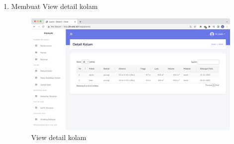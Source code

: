 \begin{enumerate}[1.]
Selanjutnya, filename dari file gambar tersebut akan diproses dengan fungsi secure\_filename dan pad\_timestamp untuk memastikan nama file yang aman dan unik. Path untuk menyimpan file gambar akan dibuat, dan file akan disimpan di path tersebut.

Kemudian, API akan mengambil data kolam ikan berdasarkan ID yang diberikan dari database. Gambar lama dari kolam ikan tersebut akan dihapus jika bukan "default.jpg" dan digantikan dengan gambar baru yang telah dipilih.

Terakhir, API akan mengembalikan response "success change image" beserta ID kolam ikan yang diubah gambarnya dengan status code 200. Jika terjadi error pada proses ini, maka akan mengembalikan response dengan pesan error dan status code 400.

Berikut merupakan hasil test request yang dari API edit foto kolam. Simulasi dibuat dengan mengisikan form 'image' dengan path image yang ada di direktori local user.

cURL:

\begin{lstlisting}
curl --location -g --request PUT 'http://jft.web.id/fishapi/api/ponds/image/{pond_id}' \
--form 'image=@"/Users/andrirahmanto/Downloads/kolam.jpeg"'
\end{lstlisting}

response json:

\begin{lstlisting}
{
  "message": "success change image",
  "id": "62a62163e445ffb9c5f746f3"
}
\end{lstlisting}

\item Membuat View detail kolam

\begin{figure}[H]
	\centering
	\includegraphics[width=1\textwidth]{gambar/Sprint03/view/view_detail_kolam}
	\caption{View detail kolam}
	\label{fig:view_detail_kolam}
\end{figure}
	
\end{enumerate}